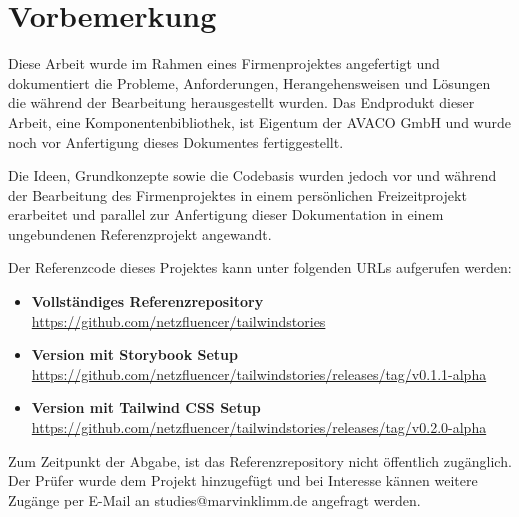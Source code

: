 \chapter*{Vorbemerkung}
\label{sec:vorbemerkung}

Diese Arbeit wurde im Rahmen eines Firmenprojektes angefertigt und dokumentiert die Probleme, Anforderungen, Herangehensweisen und Lösungen die während der Bearbeitung herausgestellt wurden. Das Endprodukt dieser Arbeit, eine Komponentenbibliothek, ist Eigentum der AVACO GmbH und wurde noch vor Anfertigung dieses Dokumentes fertiggestellt.

Die Ideen, Grundkonzepte sowie die Codebasis wurden jedoch vor und während der Bearbeitung des Firmenprojektes in einem persönlichen Freizeitprojekt erarbeitet und parallel zur Anfertigung dieser Dokumentation in einem ungebundenen Referenzprojekt angewandt.

Der Referenzcode dieses Projektes kann unter folgenden URLs aufgerufen werden:
\begin{itemize}
  \item \textbf{Vollständiges Referenzrepository}\newline
  \url{https://github.com/netzfluencer/tailwindstories}

  \item \textbf{Version mit Storybook Setup}\newline
  \url{https://github.com/netzfluencer/tailwindstories/releases/tag/v0.1.1-alpha}

  \item \textbf{Version mit Tailwind CSS Setup}\newline
  \url{https://github.com/netzfluencer/tailwindstories/releases/tag/v0.2.0-alpha}

\end{itemize}

Zum Zeitpunkt der Abgabe, ist das Referenzrepository nicht öffentlich zugänglich. Der Prüfer wurde dem Projekt hinzugefügt und bei Interesse kännen weitere Zugänge per E-Mail an studies@marvinklimm.de angefragt werden.
